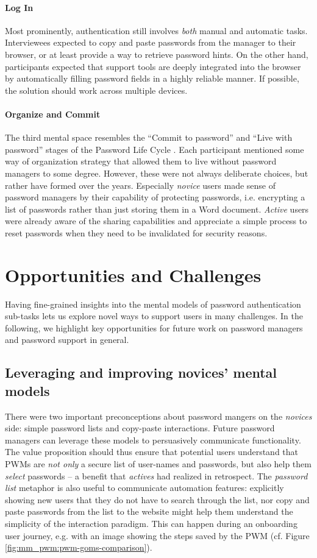 \paragraph{Log In}
Most prominently, authentication still involves \textit{both} manual and automatic tasks. Interviewees expected to copy and paste passwords from the manager to their browser, or at least provide a way to retrieve password hints.  On the other hand, participants expected that support tools are deeply integrated into the browser by automatically filling password fields in a highly reliable manner. If possible, the solution should work across multiple devices. 

\paragraph{Organize and Commit}
The third mental space resembles the ``Commit to password'' and ``Live with password'' stages of the Password Life Cycle \cite{Stobert2014PasswordLifeCycle}. Each participant mentioned some way of organization strategy that allowed them to live without password managers to some degree. However, these were not always deliberate choices, but rather have formed over the years. Especially \textit{novice} users made sense of password managers by their capability of protecting passwords, i.e. encrypting a list of passwords rather than just storing them in a Word document. \textit{Active} users were already aware of the sharing capabilities and appreciate a simple process to reset passwords when they need to be invalidated for security reasons.

\section{Opportunities and Challenges}
Having fine-grained insights into the mental models of password authentication sub-tasks lets us explore novel ways to support users in many challenges. In the following, we highlight key opportunities for future work on password managers and password support in general. 

\subsection{Leveraging and improving novices' mental models}
There were two important preconceptions about password mangers on the \textit{novices} side: simple password lists and copy-paste interactions. Future password managers can leverage these models to persuasively communicate functionality. The value proposition should thus ensure that potential users understand that PWMs are \textit{not only} a secure list of user-names and passwords, but also help them \textit{select} passwords -- a benefit that \textit{actives} had realized in retrospect. The \textit{password list} metaphor is also useful to communicate automation features: explicitly showing new users that they do not have to search through the list, nor copy and paste passwords from the list to the website might help them understand the simplicity of the interaction paradigm. This can happen during an onboarding user journey, e.g. with an image showing the steps saved by the PWM (cf. Figure \ref{fig:mm_pwm:pwm-goms-comparison}).

